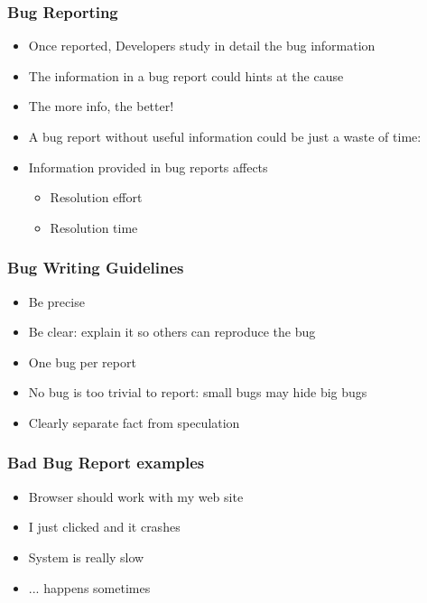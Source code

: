 \documentclass{beamer}
\begin{document}
\begin{frame}
 \frametitle{Bug Reporting}
 \begin{itemize}

    \item Once reported, Developers study in detail the bug information
    \item The information in a bug report could hints at the cause
    \item The more info, the better!
    \item A bug report without useful information could be just a waste of time: 
    \item Information provided in bug reports affects
         \begin{itemize}
         \item Resolution effort
         \item Resolution time
         \end{itemize}

 \end{itemize}
\end{frame}


\begin{frame}
 \frametitle{Bug Writing Guidelines }
 \begin{itemize}
    \item Be precise
    \item Be clear: explain it so others can reproduce the bug
    \item One bug per report
    \item No bug is too trivial to report: small bugs may hide big bugs
    \item Clearly separate fact from speculation
 \end{itemize}
\end{frame}


\begin{frame}
 \frametitle{Bad Bug Report examples}
 \begin{itemize}
     \item Browser should work with my web site
     \item I just clicked and it crashes
     \item System is really slow
     \item ... happens sometimes
 \end{itemize}
\end{frame}
\end{document}
